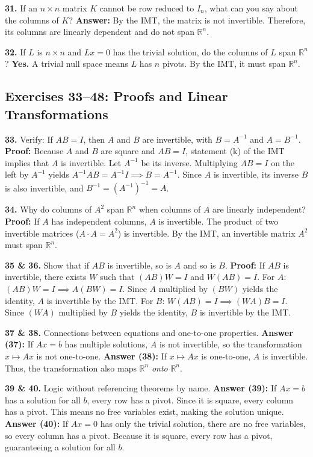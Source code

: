 \documentclass[11pt]{article}
\begin{document}
\textbf{31.} If an $n \times n$ matrix $K$ cannot be row reduced to $I_n$, what can you say about the columns of $K$?
\textbf{Answer:} By the IMT, the matrix is not invertible. Therefore, its columns are linearly dependent and do not span $\mathbb{R}^n$.

\textbf{32.} If $L$ is $n \times n$ and $Lx=0$ has the trivial solution, do the columns of $L$ span $\mathbb{R}^n$?
\textbf{Yes.} A trivial null space means $L$ has $n$ pivots. By the IMT, it must span $\mathbb{R}^n$.

\subsection*{Exercises 33--48: Proofs and Linear Transformations}
\textbf{33.} Verify: If $AB=I$, then $A$ and $B$ are invertible, with $B=A^{-1}$ and $A=B^{-1}$.
\textbf{Proof:} Because $A$ and $B$ are square and $AB=I$, statement (k) of the IMT implies that $A$ is invertible. Let $A^{-1}$ be its inverse. Multiplying $AB=I$ on the left by $A^{-1}$ yields $A^{-1}AB = A^{-1}I \implies B = A^{-1}$. Since $A$ is invertible, its inverse $B$ is also invertible, and $B^{-1} = (A^{-1})^{-1} = A$.

\textbf{34.} Why do columns of $A^2$ span $\mathbb{R}^n$ when columns of $A$ are linearly independent?
\textbf{Proof:} If $A$ has independent columns, $A$ is invertible. The product of two invertible matrices ($A \cdot A = A^2$) is invertible. By the IMT, an invertible matrix $A^2$ must span $\mathbb{R}^n$.

\textbf{35 \& 36.} Show that if $AB$ is invertible, so is $A$ and so is $B$.
\textbf{Proof:} If $AB$ is invertible, there exists $W$ such that $(AB)W = I$ and $W(AB) = I$. 
For $A$: $(AB)W = I \implies A(BW) = I$. Since $A$ multiplied by $(BW)$ yields the identity, $A$ is invertible by the IMT.
For $B$: $W(AB) = I \implies (WA)B = I$. Since $(WA)$ multiplied by $B$ yields the identity, $B$ is invertible by the IMT.

\textbf{37 \& 38.} Connections between equations and one-to-one properties.
\textbf{Answer (37):} If $Ax=b$ has multiple solutions, $A$ is not invertible, so the transformation $x \mapsto Ax$ is not one-to-one.
\textbf{Answer (38):} If $x \mapsto Ax$ is one-to-one, $A$ is invertible. Thus, the transformation also maps $\mathbb{R}^n$ \textit{onto} $\mathbb{R}^n$.

\textbf{39 \& 40.} Logic without referencing theorems by name.
\textbf{Answer (39):} If $Ax=b$ has a solution for all $b$, every row has a pivot. Since it is square, every column has a pivot. This means no free variables exist, making the solution unique.
\textbf{Answer (40):} If $Ax=0$ has only the trivial solution, there are no free variables, so every column has a pivot. Because it is square, every row has a pivot, guaranteeing a solution for all $b$.
\end{document}
